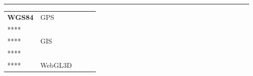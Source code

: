 \subsubsection{}\label{section-36}

\begin{center}\rule{0.5\linewidth}{0.5pt}\end{center}

\begin{longtable}[]{@{}lllll@{}}
\toprule\noalign{}
\endhead
\bottomrule\noalign{}
\endlastfoot
\textbf{WGS84} & GPS & & & \\
**** & & & & \\
**** & GIS & & & \\
**** & & & & \\
**** & WebGL3D & & & \\
\end{longtable}

\subsubsection{}\label{section-37}

